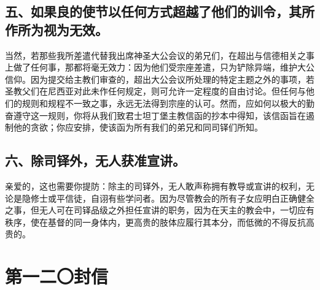 
\subsection{五、如果良的使节以任何方式超越了他们的训令，其所作所为视为无效。}

当然，若那些我所差遣代替我出席神圣大公会议的弟兄们，在超出与信德相关之事上做了任何事，那都将毫无效力：因为他们受宗座差遣，只为铲除异端，维护大公信仰。因为提交给主教们审查的，超出大公会议所处理的特定主题之外的事项，若圣教父们在尼西亚对此未作任何规定，则可允许一定程度的自由讨论。但任何与他们的规则和规程不一致之事，永远无法得到宗座的认可。然而，应如何以极大的勤奋遵守这一规则，你将从我们致君士坦丁堡主教信函的抄本中得知，该信函旨在遏制他的贪欲；你应安排，使该函为所有我们的弟兄和同司铎们所知。\par


\subsection{六、除司铎外，无人获准宣讲。}

亲爱的，这也需要你提防：除主的司铎外，无人敢声称拥有教导或宣讲的权利，无论是隐修士或平信徒，自诩有些学问者。因为尽管教会的所有子女应明白正确健全之事，但无人可在司铎品级之外担任宣讲的职务，因为在天主的教会中，一切应有秩序，使在基督的同一身体内，更高贵的肢体应履行其本分，而低微的不得反抗高贵的。\par



\section{第一二〇封信}

\par


